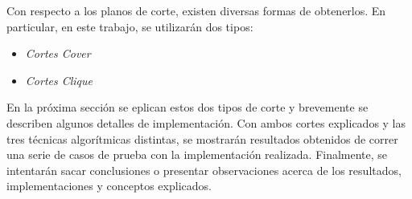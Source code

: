 Con respecto a los planos de corte, existen diversas formas de obtenerlos. En particular, en este trabajo, se utilizarán dos tipos:

\begin{itemize}
\item \emph{Cortes Cover}
\item \emph{Cortes Clique}
\end{itemize}

En la próxima sección se eplican estos dos tipos de corte y brevemente se describen algunos detalles de implementación. Con ambos cortes explicados y las tres técnicas algorítmicas distintas, se mostrarán resultados obtenidos de correr una serie de casos de prueba con la implementación realizada. Finalmente, se intentarán sacar conclusiones o presentar observaciones acerca de los resultados, implementaciones y conceptos explicados.
